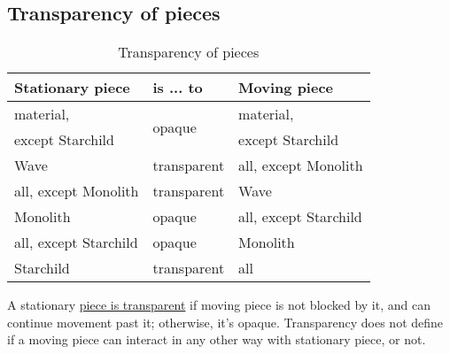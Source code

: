 \clearpage %

\subsection*{Transparency of pieces}
\label{sec:Appendix/Summary/Transparency of pieces}

\begin{table}[!h]
\centering
\begin{tabular}{ lll }
\toprule %
\textbf{Stationary piece}           & \textbf{is ... to}            & \textbf{Moving piece}         \\
\midrule %
material\footnotemark[1],           & \multirow{2}{*}{opaque}       & material\footnotemark[1],     \\
except Starchild                    &                               & except Starchild              \\
\cmidrule{1-3} %
Wave                                & transparent                   & all, except Monolith          \\
all, except Monolith                & transparent                   & Wave                          \\
Monolith                            & opaque                        & all, except Starchild         \\
all, except Starchild               & opaque                        & Monolith                      \\
Starchild                           & transparent                   & all                           \\
\bottomrule %
\end{tabular}
\caption{Transparency of pieces}
\label{tbl:Appendix/Summary/Transparency of pieces}
\end{table}


A stationary \hyperref[fig:scn_mv_07_wave_is_transparent]{piece is transparent}
if moving piece is not blocked by it, and can continue movement past it; otherwise,
it's opaque. Transparency does not define if a moving piece can interact in any
other way with stationary piece, or not.

